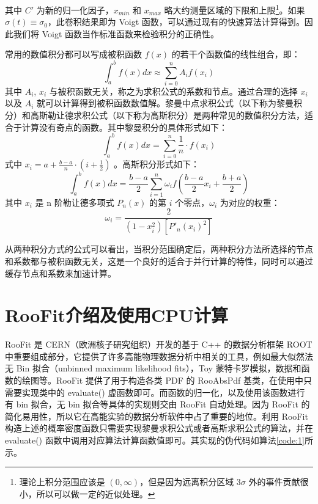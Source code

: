 其中 $C'$ 为新的归一化因子，$x_{min}$ 和 $x_{max}$ 略大约测量区域的下限和上限\footnote{理论上积分范围应该是 $(0,\infty)$，但是因为远离积分区域 $3\sigma$ 外的事件贡献很小，所以可以做一定的近似处理。 }。如果 $\sigma(t)\equiv\sigma_0$，此卷积结果即为 Voigt 函数，可以通过现有的快速算法计算得到\supercite{abrarov2011efficient}。因此我们将 Voigt 函数当作标准函数来检验积分的正确性。

常用的数值积分都可以写成被积函数 $f(x)$ 的若干个函数值的线性组合，即：
\begin{equation}
    \int_a^bf(x)dx\approx\sum_{i=0}^n A_i f(x_i)
\end{equation}
其中 $A_i$, $x_i$ 与被积函数无关，称之为求积公式的系数和节点\supercite{jisuanfangfa}。通过合理的选择 $x_i$ 以及 $A_i$ 就可以计算得到被积函数数值解。黎曼中点求积公式（以下称为黎曼积分）和高斯勒让德求积公式（以下称为高斯积分）是两种常见的数值积分方法\supercite{jisuanfangfa}，适合于计算没有奇点的函数。其中黎曼积分的具体形式如下：
\begin{equation}
    \int_a^bf(x)dx = \sum_{i=0}^n \frac{1}{n}\cdot f(x_i)
\end{equation}
式中 $x_i=a+\frac{b-a}{n}\cdot(i+\frac{1}{2})$ 。高斯积分形式如下：
\begin{equation}
\int_a^bf(x)dx=\frac{b-a}{2}\sum_{i=1}^n\omega_if(\frac{b-a}{2}x_i+\frac{b+a}{2})
\end{equation}
其中 $x_i$ 是 n 阶勒让德多项式 $P_n(x)$ 的第 $i$ 个零点，$\omega_i$ 为对应的权重\supercite{jisuanfangfa}\supercite{bogaert2014iteration}：
$$\omega_i=\frac{2}{(1-x_i^2)[P'_n(x_i)^2]}$$

从两种积分方式的公式可以看出，当积分范围确定后，两种积分方法所选择的节点和系数都与被积函数无关，这是一个良好的适合于并行计算的特性，同时可以通过缓存节点和系数来加速计算。

\section{RooFit介绍及使用CPU计算}

RooFit 是 CERN（欧洲核子研究组织）开发的基于 C++ 的数据分析框架 ROOT 中重要组成部分\supercite{roofit}\supercite{root}，它提供了许多高能物理数据分析中相关的工具，例如最大似然法无 Bin 拟合（unbinned maximum likelihood fits），Toy 蒙特卡罗模拟，数据和函数的绘图等。RooFit 提供了用于构造各类 PDF 的 RooAbsPdf 基类，在使用中只需要实现类中的 evaluate() 虚函数即可。而函数的归一化，以及使用该函数进行有 bin 拟合，无 bin 拟合等具体的实现则交由 RooFit 自动处理。因为 RooFit 的简化易用性，所以它在高能实验的数据分析软件中占了重要的地位。利用 RooFit 构造上述的概率密度函数只需要实现黎曼求积公式或者高斯求积公式的算法，并在 evaluate() 函数中调用对应算法计算函数值即可。其实现的伪代码如算法\ref{code:1}所示。

